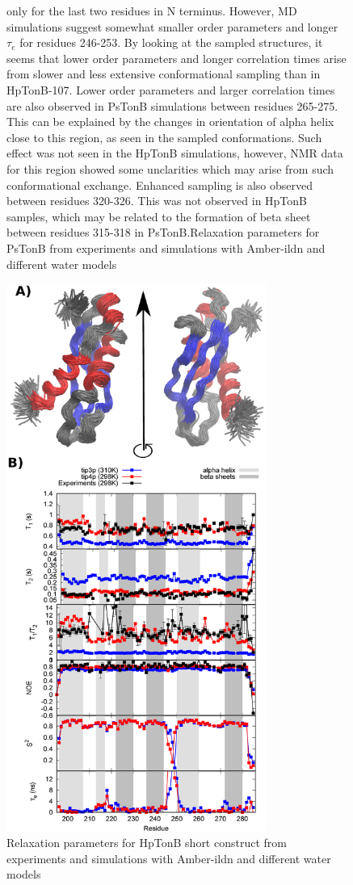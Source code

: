 \documentclass[pre,aps,floatfix,authordate1-4,twocolumn]{revtex4-1}
\begin{document}
\begin{figure}[!h]
{    only for the last two residues in N terminus. However,
    MD simulations suggest somewhat smaller order parameters and longer $\tau_e$
    for residues 246-253. By looking at the sampled structures, it seems that lower
    order parameters and longer correlation times arise from slower and less extensive
    conformational sampling than in HpTonB-107. Lower order parameters and larger
    correlation times are also observed in PsTonB simulations between residues 265-275.
    This can be explained by the changes in orientation of alpha helix close to this
    region, as seen in the sampled conformations. Such effect was not seen in the HpTonB
    simulations, however, NMR data for this region showed some unclarities which may arise
    from such conformational exchange. Enhanced sampling is also observed between
    residues 320-326. This was not observed in HpTonB samples, which may be related to the
    formation of beta sheet between residues 315-318 in PsTonB.Relaxation parameters for PsTonB from
    experiments and simulations with Amber-ildn and different water models
    \label{PsTonBrelaxationDATA}}%
\end{figure}
\begin{figure}[!h]
  \includegraphics[width=8.5cm]{../Figs/RELdataHpTonB.eps}%
  \caption{Relaxation parameters for HpTonB short construct from
    experiments and simulations with Amber-ildn and different water models
    \label{HpTonBrelaxationDATA}}%
\end{figure}
\end{document}
